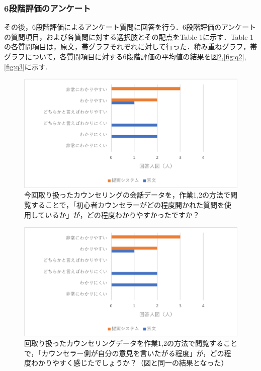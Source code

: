 \documentclass[shuuron]{kuee}
\begin{document}
\subsubsection{6段階評価のアンケート}

その後，6段階評価によるアンケート質問に回答を行う．6段階評価のアンケートの質問項目，および各質問に対する選択肢とその配点をTable 1に示す．Table 1の各質問項目は，原文，帯グラフそれぞれに対して行った．積み重ねグラフ，帯グラフについて，各質問項目に対する6段階評価の平均値の結果を図\ref{fig:q1},\ref{fig:q2},\ref{fig:q3}に示す.



\begin{figure}
  \begin{center}
    \includegraphics[width=\linewidth]{q1.png}
  \end{center}
  \caption{今回取り扱ったカウンセリングの会話データを，作業1,2の方法で閲覧することで，「初心者カウンセラーがどの程度開かれた質問を使用しているか」が，どの程度わかりやすかったですか？}
  \label{fig:q1}
\end{figure}

\begin{figure}
  \begin{center}
    \includegraphics[width=\linewidth]{q1.png}
  \end{center}
  \caption{回取り扱ったカウンセリングデータを作業1,2の方法で閲覧することで，「カウンセラー側が自分の意見を言いたがる程度」が，どの程度わかりやすく感じたでしょうか？（図\label{fig:q1}と同一の結果となった）}
  \label{fig:q1}
\end{figure}
\end{document}
